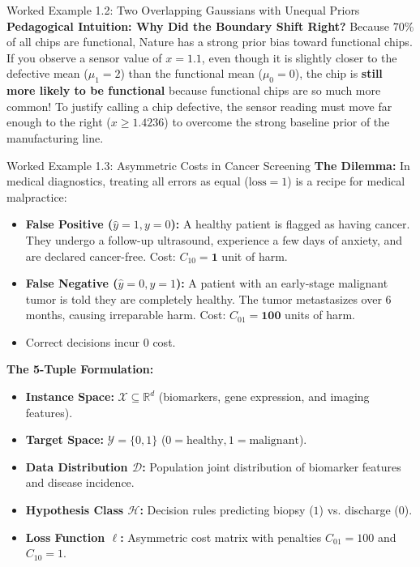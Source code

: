 \begin{examplebox}{Worked Example 1.2: Two Overlapping Gaussians with Unequal Priors}
\textbf{Pedagogical Intuition: Why Did the Boundary Shift Right?}
Because $70\%$ of all chips are functional, Nature has a strong prior bias toward functional chips. If you observe a sensor value of $x = 1.1$, even though it is slightly closer to the defective mean ($\mu_1 = 2$) than the functional mean ($\mu_0 = 0$), the chip is \textbf{still more likely to be functional} because functional chips are so much more common!
To justify calling a chip defective, the sensor reading must move far enough to the right ($x \ge 1.4236$) to overcome the strong baseline prior of the manufacturing line.
\end{examplebox}

\begin{examplebox}{Worked Example 1.3: Asymmetric Costs in Cancer Screening}
\label{ex:w01_cancer_screening}
\textbf{The Dilemma:}
In medical diagnostics, treating all errors as equal ($\text{loss} = 1$) is a recipe for medical malpractice:
\begin{itemize}
    \item \textbf{False Positive ($\hat{y} = 1, y = 0$):} A healthy patient is flagged as having cancer. They undergo a follow-up ultrasound, experience a few days of anxiety, and are declared cancer-free. Cost: $C_{10} = \mathbf{1}$ unit of harm.
    \item \textbf{False Negative ($\hat{y} = 0, y = 1$):} A patient with an early-stage malignant tumor is told they are completely healthy. The tumor metastasizes over 6 months, causing irreparable harm. Cost: $C_{01} = \mathbf{100}$ units of harm.
    \item Correct decisions incur $0$ cost.
\end{itemize}

\textbf{The 5-Tuple Formulation:}
\begin{itemize}
    \item \textbf{Instance Space:} $\mathcal{X} \subseteq \mathbb{R}^d$ (biomarkers, gene expression, and imaging features).
    \item \textbf{Target Space:} $\mathcal{Y} = \{0, 1\}$ ($0 = \text{healthy}, 1 = \text{malignant}$).
    \item \textbf{Data Distribution $\mathcal{D}$:} Population joint distribution of biomarker features and disease incidence.
    \item \textbf{Hypothesis Class $\mathcal{H}$:} Decision rules predicting biopsy ($1$) vs. discharge ($0$).
    \item \textbf{Loss Function $\ell$:} Asymmetric cost matrix with penalties $C_{01} = 100$ and $C_{10} = 1$.
\end{itemize}


\end{examplebox}
